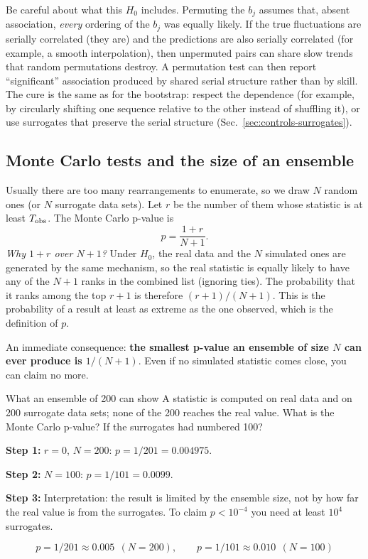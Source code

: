 Be careful about what this $H_0$ includes. Permuting the $b_j$ assumes that, absent association, \emph{every} ordering of the $b_j$ was equally likely. If the true fluctuations are serially correlated (they are) and the predictions are also serially correlated (for example, a smooth interpolation), then unpermuted pairs can share slow trends that random permutations destroy. A permutation test can then report ``significant'' association produced by shared serial structure rather than by skill. The cure is the same as for the bootstrap: respect the dependence (for example, by circularly shifting one sequence relative to the other instead of shuffling it), or use surrogates that preserve the serial structure (Sec.~\ref{sec:controls-surrogates}).

\subsection{Monte Carlo tests and the size of an ensemble}

Usually there are too many rearrangements to enumerate, so we draw $N$ random ones (or $N$ surrogate data sets). Let $r$ be the number of them whose statistic is at least $T_{\rm obs}$. The Monte Carlo p-value is
\begin{equation}
p=\frac{1+r}{N+1}.
\label{eq:controls-mcp}
\end{equation}
\emph{Why $1+r$ over $N+1$?} Under $H_0$, the real data and the $N$ simulated ones are generated by the same mechanism, so the real statistic is equally likely to have any of the $N+1$ ranks in the combined list (ignoring ties). The probability that it ranks among the top $r+1$ is therefore $(r+1)/(N+1)$. This is the probability of a result at least as extreme as the one observed, which is the definition of $p$.

An immediate consequence: \textbf{the smallest p-value an ensemble of size $N$ can ever produce is $1/(N+1)$}. Even if no simulated statistic comes close, you can claim no more.

\begin{sample}{What an ensemble of 200 can show}
A statistic is computed on real data and on 200 surrogate data sets; none of the 200 reaches the real value. What is the Monte Carlo p-value? If the surrogates had numbered 100?

\textbf{Step 1:} $r=0$, $N=200$: $p=1/201=0.004975$.

\textbf{Step 2:} $N=100$: $p=1/101=0.0099$.

\textbf{Step 3:} Interpretation: the result is limited by the ensemble size, not by how far the real value is from the surrogates. To claim $p<10^{-4}$ you need at least $10^4$ surrogates.

\[
\boxed{p=1/201\approx0.005\ \ (N=200),\qquad p=1/101\approx0.010\ \ (N=100)}
\]
\end{sample}

